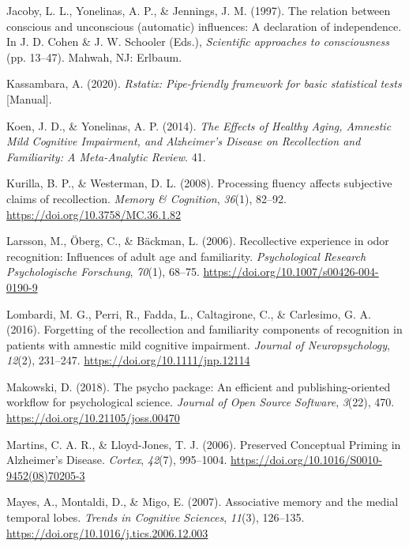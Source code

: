 \documentclass[
  11pt,
]{article}
\begin{document}
\leavevmode\hypertarget{ref-jacoby1997}{}%
Jacoby, L. L., Yonelinas, A. P., \& Jennings, J. M. (1997). The relation
between conscious and unconscious (automatic) influences: A declaration
of independence. In J. D. Cohen \& J. W. Schooler (Eds.),
\emph{Scientific approaches to consciousness} (pp. 13--47). Mahwah, NJ:
Erlbaum.

\leavevmode\hypertarget{ref-rstatix}{}%
Kassambara, A. (2020). \emph{Rstatix: Pipe-friendly framework for basic
statistical tests} {[}Manual{]}.

\leavevmode\hypertarget{ref-koen2014}{}%
Koen, J. D., \& Yonelinas, A. P. (2014). \emph{The Effects of Healthy
Aging, Amnestic Mild Cognitive Impairment, and Alzheimer's Disease on
Recollection and Familiarity: A Meta-Analytic Review}. 41.

\leavevmode\hypertarget{ref-kurilla2008}{}%
Kurilla, B. P., \& Westerman, D. L. (2008). Processing fluency affects
subjective claims of recollection. \emph{Memory \& Cognition},
\emph{36}(1), 82--92. \url{https://doi.org/10.3758/MC.36.1.82}

\leavevmode\hypertarget{ref-larsson2006}{}%
Larsson, M., Öberg, C., \& Bäckman, L. (2006). Recollective experience
in odor recognition: Influences of adult age and familiarity.
\emph{Psychological Research Psychologische Forschung}, \emph{70}(1),
68--75. \url{https://doi.org/10.1007/s00426-004-0190-9}

\leavevmode\hypertarget{ref-lombardi2016}{}%
Lombardi, M. G., Perri, R., Fadda, L., Caltagirone, C., \& Carlesimo, G.
A. (2016). Forgetting of the recollection and familiarity components of
recognition in patients with amnestic mild cognitive impairment.
\emph{Journal of Neuropsychology}, \emph{12}(2), 231--247.
\url{https://doi.org/10.1111/jnp.12114}

\leavevmode\hypertarget{ref-psycho}{}%
Makowski, D. (2018). The psycho package: An efficient and
publishing-oriented workflow for psychological science. \emph{Journal of
Open Source Software}, \emph{3}(22), 470.
\url{https://doi.org/10.21105/joss.00470}

\leavevmode\hypertarget{ref-martins2006}{}%
Martins, C. A. R., \& Lloyd-Jones, T. J. (2006). Preserved Conceptual
Priming in Alzheimer's Disease. \emph{Cortex}, \emph{42}(7), 995--1004.
\url{https://doi.org/10.1016/S0010-9452(08)70205-3}

\leavevmode\hypertarget{ref-mayes2007}{}%
Mayes, A., Montaldi, D., \& Migo, E. (2007). Associative memory and the
medial temporal lobes. \emph{Trends in Cognitive Sciences},
\emph{11}(3), 126--135. \url{https://doi.org/10.1016/j.tics.2006.12.003}
\end{document}
